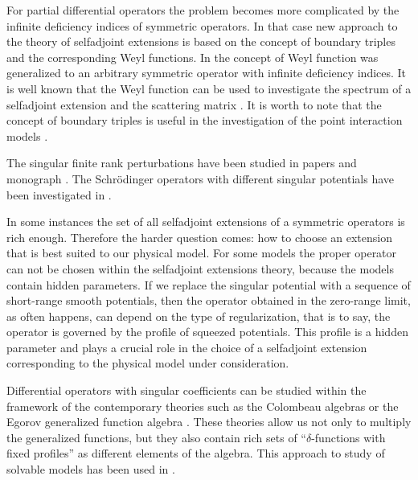 \documentclass[11pt,english]{amsart}%
\begin{document}
For partial differential operators the problem becomes more complicated by the infinite deficiency indices of symmetric operators. In that case new approach to the theory of selfadjoint extensions is based on
the concept of boundary triples \cite{Gorbachuky, GorbachukyKochubej} and the corresponding Weyl
functions. In \cite{DerkachMalamud1, DerkachMalamud2} the concept of Weyl function
was generalized to an arbitrary symmetric operator  with infinite deficiency indices.
It is well known that the Weyl function can be used to investigate the spectrum of a selfadjoint extension
and the scattering matrix \cite{BrascheMalamudNeidhardt2002}.
It is worth to note that the concept of boundary triples is useful in the investigation of the point interaction mo\-dels \cite{GoloschapovaOridoroga, KochubeyUMZh1989,
KochubeySibMatZh1991, KochubeyMatNotes1979}.

The singular finite rank perturbations have been studied in papers \cite{AlbeverioKoshmanenko1999, KuzhelNizhnik,
KoshmanenkoUMZh1991, Nizhnik2001} and monograph \cite{KoshmanenkoBook}. The Schr\"{o}dinger operators with different singular potentials have been investigated in \cite{HrynivMykytiuk2001, MikhailetsMolyboga, NizhFAA2003,
ShkalikovSavchMatNotes2006, ShkalikovSavchukMatNotes1999,
ShkalikovSavchukTMMO2003}.



In some instances the set of all selfadjoint extensions of a symmetric operators is rich enough.
Therefore the harder question comes: how to choose an extension that is best suited to our physical model.
For some models the proper operator can not be chosen within the selfadjoint extensions theory, because
the models contain hidden parameters. If we replace the singular potential with a sequence of short-range smooth potentials, then the operator obtained in the zero-range limit, as often happens, can depend on the type of regularization, that is to say, the operator is governed by the profile of squeezed potentials. This profile is a hidden parameter and plays a crucial role in the choice of a selfadjoint extension corresponding to the physical model under consideration.

Differential operators with singular coefficients can be studied within the framework of the contemporary theories such as
the Colombeau algebras \cite{Colombeau} or the  Egorov  generalized  function algebra \cite{Egorov}.
These theories allow us not only to multiply the generalized functions, but they also contain  rich sets of
``$\delta$-functions with  fixed profiles''  as  different elements of the algebra.
This approach to study of  solvable models has been used in \cite{Antonevich1, Antonevich2}.
\end{document}
